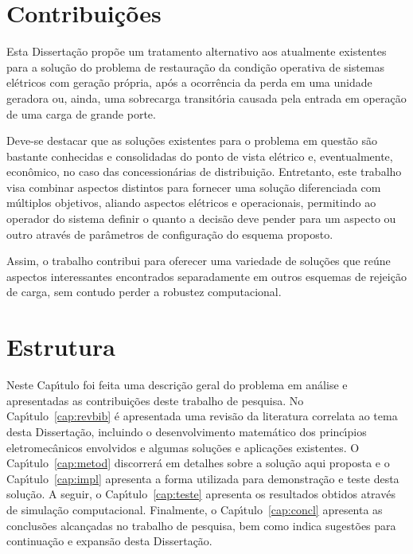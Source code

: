 \section{Contribui{\c c}{\~o}es}\label{sec:contrib}

Esta Disserta{\c c}{\~a}o prop{\~o}e um tratamento alternativo aos atualmente existentes para a solu{\c c}{\~a}o do problema de restaura{\c c}{\~a}o da condi{\c c}{\~a}o operativa de sistemas el{\'e}tricos com gera{\c c}{\~a}o pr{\'o}pria, ap{\'o}s a ocorr{\^e}ncia da perda em uma unidade geradora ou, ainda, uma sobrecarga transit{\'o}ria causada pela entrada em opera{\c c}{\~a}o de uma carga de grande porte.

Deve-se destacar que as solu{\c c}{\~o}es existentes para o problema em quest{\~a}o s{\~a}o bastante conhecidas e consolidadas do ponto de vista el{\'e}trico e, eventualmente, econ{\^o}mico, no caso das concession{\'a}rias de distribui{\c c}{\~a}o. Entretanto, este trabalho visa combinar aspectos distintos para fornecer uma solu{\c c}{\~a}o diferenciada com m{\'u}ltiplos objetivos, aliando aspectos el{\'e}tricos e operacionais, permitindo ao operador do sistema definir o quanto a decis{\~a}o deve pender para um aspecto ou outro atrav{\'e}s de par{\^a}metros de configura{\c c}{\~a}o do esquema proposto.

Assim, o trabalho contribui para oferecer uma variedade de solu{\c c}{\~o}es que re{\'u}ne aspectos interessantes encontrados separadamente em outros esquemas de rejei{\c c}{\~a}o de carga, sem contudo perder a robustez computacional.

\section{Estrutura}\label{sec:estrut}

Neste Cap{\'\i}tulo foi feita uma descri{\c c}{\~a}o geral do problema em an{\'a}lise e apresentadas as contribui{\c c}{\~o}es deste trabalho de pesquisa. No Cap{\'\i}tulo~\ref{cap:revbib} {\'e} apresentada uma revis{\~a}o da literatura correlata ao tema desta Disserta{\c c}{\~a}o, incluindo o desenvolvimento matem{\'a}tico dos princ{\'\i}pios eletromec{\^a}nicos envolvidos e algumas solu{\c c}{\~o}es e aplica{\c c}{\~o}es existentes. O Cap{\'\i}tulo~\ref{cap:metod} discorrer{\'a} em detalhes sobre a solu{\c c}{\~a}o aqui proposta e o Cap{\'\i}tulo~\ref{cap:impl} apresenta a forma utilizada para demonstra{\c c}{\~a}o e teste desta solu{\c c}{\~a}o. A seguir, o Cap{\'\i}tulo~\ref{cap:teste} apresenta os resultados obtidos atrav{\'e}s de simula{\c c}{\~a}o computacional. Finalmente, o Cap{\'\i}tulo~\ref{cap:concl} apresenta as conclus{\~o}es alcan{\c c}adas no trabalho de pesquisa, bem como indica sugest{\~o}es para continua{\c c}{\~a}o e expans{\~a}o desta Disserta{\c c}{\~a}o.


